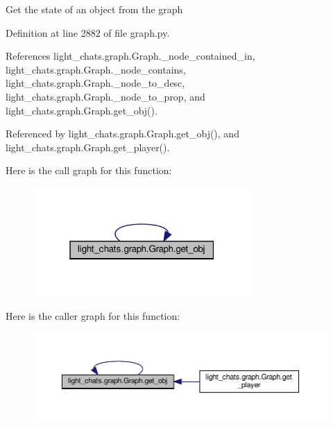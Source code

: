 \begin{DoxyVerb}Get the state of an object from the graph\end{DoxyVerb}
 

Definition at line 2882 of file graph.\+py.



References light\+\_\+chats.\+graph.\+Graph.\+\_\+node\+\_\+contained\+\_\+in, light\+\_\+chats.\+graph.\+Graph.\+\_\+node\+\_\+contains, light\+\_\+chats.\+graph.\+Graph.\+\_\+node\+\_\+to\+\_\+desc, light\+\_\+chats.\+graph.\+Graph.\+\_\+node\+\_\+to\+\_\+prop, and light\+\_\+chats.\+graph.\+Graph.\+get\+\_\+obj().



Referenced by light\+\_\+chats.\+graph.\+Graph.\+get\+\_\+obj(), and light\+\_\+chats.\+graph.\+Graph.\+get\+\_\+player().

Here is the call graph for this function\+:
\nopagebreak
\begin{figure}[H]
\begin{center}
\leavevmode
\includegraphics[width=235pt]{classlight__chats_1_1graph_1_1Graph_ad965678de8b784a4c1506a8814f39767_cgraph}
\end{center}
\end{figure}
Here is the caller graph for this function\+:
\nopagebreak
\begin{figure}[H]
\begin{center}
\leavevmode
\includegraphics[width=350pt]{classlight__chats_1_1graph_1_1Graph_ad965678de8b784a4c1506a8814f39767_icgraph}
\end{center}
\end{figure}
\mbox{\label{classlight__chats_1_1graph_1_1Graph_adf4ddcd30a97e5d02bc23f5c0a09c8bb}} 
